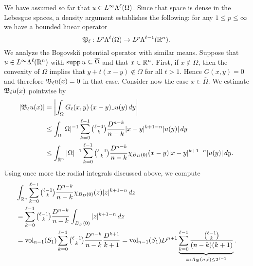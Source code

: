 \documentclass[12pt,a4paper]{article}
\begin{document}
We have assumed so far that $u \in L^{\infty}\Lambda^{\ell}(\Omega)$. 
Since that space is dense in the Lebesgue spaces, a density argument establishes the following: 
for any $1 \leq p \leq \infty$ we have a bounded linear operator 
\[
    {\mathfrak P}_{\ell} : L^{p}\Lambda^{\ell}(\Omega) \rightarrow L^{p}\Lambda^{\ell-1}({\mathbb R}^n).
\]
% 
We analyze the Bogovski\u{\i} potential operator with similar means. 
Suppose that $u \in L^{\infty}\Lambda^{\ell}({\mathbb R}^{n})$ with $\operatorname{supp} u \subseteq \overline\Omega$ and that $x \in {\mathbb R}^{n}$.
First, if $x \notin \Omega$, then the convexity of $\Omega$ implies that $y + t( x - y ) \notin \Omega$ for all $t > 1$. Hence $G(x,y) = 0$ and therefore ${\mathfrak B}_{\ell} u(x) = 0$ in that case.
Consider now the case $x \in \overline\Omega$. 
We estimate ${\mathfrak B}_{\ell} u(x)$ pointwise by 
\begin{align*}
    \left| {\mathfrak B}_{\ell} u(x) \right|
    &=
    \left| 
        \int_{\Omega} G_{\ell}(x,y) \,(x-y)\lrcorner u(y)\,dy
    \right| 
    \\&\leq 
    \int_{\Omega} |\Omega|^{-1} \sum_{k=0}^{\ell-1}\tbinom{\ell-1}{k} \frac{ D^{n-k} }{n-k} |x-y|^{k+1-n} |u(y)| \,dy
    \\&\leq 
    \int_{{\mathbb R}^{n}} |\Omega|^{-1} \sum_{k=0}^{\ell-1}\tbinom{\ell-1}{k} \frac{ D^{n-k} }{n-k} \chi_{B_D(0)}(x-y) |x-y|^{k+1-n} |u(y)| \,dy
    .
\end{align*}
Using once more the radial integrals discussed above, we compute 
\begin{align*}
    &
    \int_{{\mathbb R}^{n}} \sum_{k=0}^{\ell-1} \tbinom{\ell-1}{k} \frac{ D^{n-k} }{n-k} \chi_{B_D(0)}(z) |z|^{k+1-n} \,dz
    \\&
    =
    \sum_{k=0}^{\ell-1} \tbinom{\ell-1}{k} \frac{ D^{n-k} }{n-k} \int_{B_D(0)} |z|^{k+1-n} \,dz
    \\&
    =
    \operatorname{vol}_{n-1}(S_1) \sum_{k=0}^{\ell-1} \tbinom{\ell-1}{k} \frac{ D^{n-k} }{n-k} \frac{D^{k+1}}{k+1}
    =
    \operatorname{vol}_{n-1}(S_1) D^{n+1} \underbrace{ \sum_{k=0}^{\ell-1} \frac{ \tbinom{\ell-1}{k} }{ (n-k)(k+1) } }_{ =: A_{{\mathfrak B}}(n,\ell) \leq 2^{\ell-1}}
    .
\end{align*}
\end{document}
